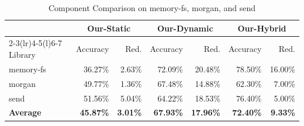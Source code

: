 \begin{table}[htbp]
\centering
\caption{Component Comparison on memory-fs, morgan, and send}
\label{tab:ablation}
\small
\setlength{\tabcolsep}{4.4pt}
\renewcommand{\arraystretch}{1.10}
\begin{tabular*}{1.0\linewidth}{@{\extracolsep{\fill}}lrrrrrr@{}}
\toprule
& \multicolumn{2}{c}{Our-Static} & \multicolumn{2}{c}{Our-Dynamic} & \multicolumn{2}{c}{Our-Hybrid} \\
\cmidrule(lr){2-3}\cmidrule(lr){4-5}\cmidrule(l){6-7}
Library & Accuracy & Red. & Accuracy & Red. & Accuracy & Red. \\
\midrule
memory-fs & 36.27\% & 2.63\% & 72.09\% & 20.48\% & 78.50\% & 16.00\% \\
morgan & 49.77\% & 1.36\% & 67.48\% & 14.88\% & 62.30\% & 7.00\% \\
send & 51.56\% & 5.04\% & 64.22\% & 18.53\% & 76.40\% & 5.00\% \\
\midrule
\textbf{Average} & \textbf{45.87\%} & \textbf{3.01\%} & \textbf{67.93\%} & \textbf{17.96\%} & \textbf{72.40\%} & \textbf{9.33\%} \\
\bottomrule
\end{tabular*}
\end{table}
